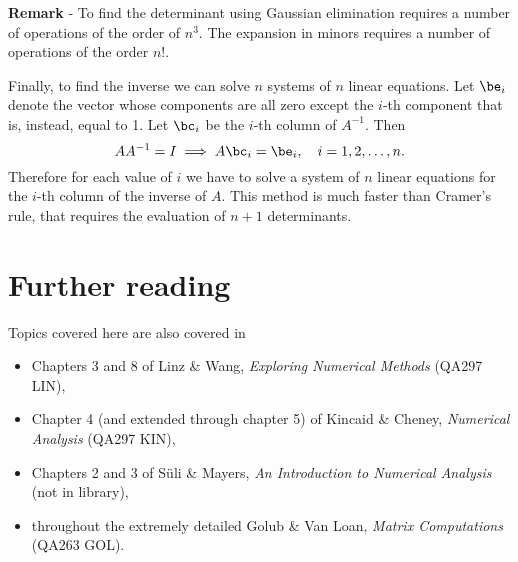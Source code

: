 \noindent
\textbf{Remark} - To find the determinant using Gaussian elimination
requires a number of operations of the order of $n^3$.   The expansion
in minors requires a number of operations of the order $n!$.

\medskip

Finally, to find the inverse we can solve $n$ systems of $n$ linear
equations.  Let $\be_i$ denote the vector whose components are all
zero except the $i$-th component that is, instead, equal to 1.   Let
$\bc_i$ be the $i$-th column of $A^{-1}$.   Then
%
\begin{equation*}
  A A^{-1} = I \implies A \bc_i = \be_i , \quad i=1,2,\ldots,n.
\end{equation*}
%
Therefore for each value of $i$ we have to solve a system of $n$
linear equations for the $i$-th column of the inverse of $A$.   This
method is much faster than Cramer's rule, that requires the evaluation
of $n+1$ determinants.

\section*{Further reading}

Topics covered here are also covered in
\begin{itemize}
\item Chapters 3 and 8 of Linz \& Wang, \textit{Exploring Numerical
    Methods} (QA297 LIN),
\item Chapter 4 (and extended through chapter 5) of Kincaid \& Cheney,
  \textit{Numerical Analysis} (QA297 KIN),
\item Chapters 2 and 3 of S{\"u}li \& Mayers, \textit{An Introduction
    to Numerical Analysis} (not in library),
\item throughout the extremely detailed Golub \& Van Loan,
  \textit{Matrix Computations} (QA263 GOL).
\end{itemize}
